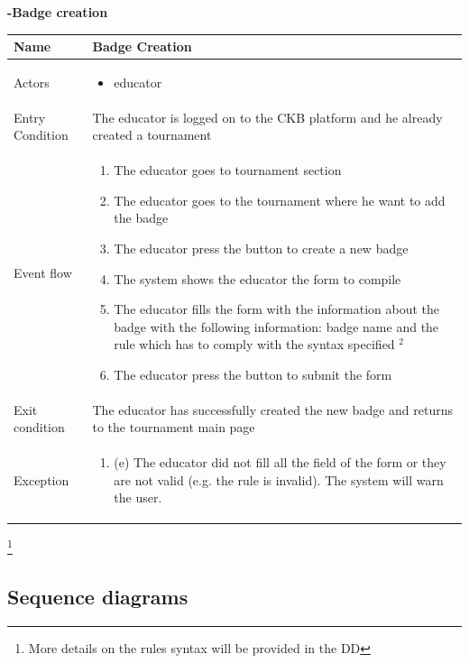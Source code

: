 \begin{enumerate}[label=\textbf{[UC\arabic*]}]
 \item \textbf{-Badge creation}
    \\ \begin{tabular}{|l|p{11cm}|}
        \hline
        Name & Badge Creation \\
        \hline
        Actors & \begin{itemize}
                    \item educator
                \end{itemize} \\
        \hline
        Entry Condition & The educator is logged on to the CKB platform and he already created a tournament\\
        \hline
        Event flow & \begin{enumerate}
            \item The educator goes to tournament section
            \item The educator goes to the tournament where he want to add the badge
            \item The educator press the button to create a new badge
            \item The system shows the educator the form to compile
            \item The educator fills the form with the information about the badge with the following information: badge name and the rule which has to comply with the syntax specified $^2$
            \item The educator press the button to submit the form
        \end{enumerate}\\
        \hline
        Exit condition & The educator has successfully created the new badge and returns to the tournament main page \\
        \hline
        Exception & \begin{enumerate} [label={}, leftmargin=0.25cm ]
            \item (e) The educator did not fill all the field of the form or they are not valid  (e.g. the rule is invalid). The system will warn the user. 
        \end{enumerate}\\
        \hline            
    \end{tabular}
    \footnote{More details on the rules syntax will be provided in the DD}
\end{enumerate}
\newpage

\subsection{Sequence diagrams}

